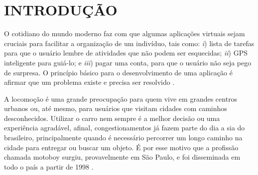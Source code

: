
\chapter{INTRODUÇÃO}


O cotidiano do mundo moderno faz com que algumas aplicações virtuais sejam cruciais para facilitar a organização de um indivíduo, tais como: \textit{i}) lista de tarefas para que o usuário lembre de atividades que não podem ser esquecidas; \textit{ii}) GPS inteligente para guiá-lo; e \textit{iii}) pagar uma conta, para que o usuário não seja pego de surpresa. O princípio básico para o desenvolvimento de uma aplicação é afirmar que um problema existe e precisa ser resolvido \cite{desenvWebFrame}.


A locomoção é uma grande preocupação para quem vive em grandes centros urbanos ou, até mesmo, para usuários que visitam cidades com caminhos desconhecidos. Utilizar o carro nem sempre é a melhor decisão ou uma experiência agradável, afinal, congestionamentos já fazem parte do dia a sia do brasileiro, principalmente quando é necessário percorrer um longo caminho na cidade para entregar ou buscar um objeto. É por esse motivo que a profissão chamada motoboy surgiu, provavelmente em São Paulo, e foi disseminada em todo o país a partir de 1998 \cite{MotoboyVeja}.

